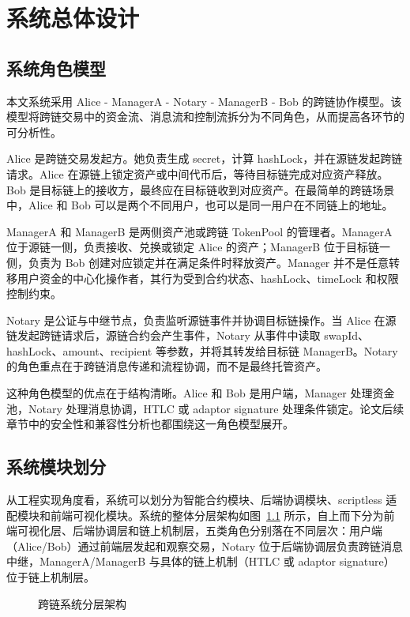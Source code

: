 
\chapter{系统总体设计}


\section{系统角色模型}


本文系统采用 Alice - ManagerA - Notary - ManagerB - Bob 的跨链协作模型。该模型将跨链交易中的资金流、消息流和控制流拆分为不同角色，从而提高各环节的可分析性。


Alice 是跨链交易发起方。她负责生成 secret，计算 hashLock，并在源链发起跨链请求。Alice 在源链上锁定资产或中间代币后，等待目标链完成对应资产释放。Bob 是目标链上的接收方，最终应在目标链收到对应资产。在最简单的跨链场景中，Alice 和 Bob 可以是两个不同用户，也可以是同一用户在不同链上的地址。


ManagerA 和 ManagerB 是两侧资产池或跨链 TokenPool 的管理者。ManagerA 位于源链一侧，负责接收、兑换或锁定 Alice 的资产；ManagerB 位于目标链一侧，负责为 Bob 创建对应锁定并在满足条件时释放资产。Manager 并不是任意转移用户资金的中心化操作者，其行为受到合约状态、hashLock、timeLock 和权限控制约束。


Notary 是公证与中继节点，负责监听源链事件并协调目标链操作。当 Alice 在源链发起跨链请求后，源链合约会产生事件，Notary 从事件中读取 swapId、hashLock、amount、recipient 等参数，并将其转发给目标链 ManagerB。Notary 的角色重点在于跨链消息传递和流程协调，而不是最终托管资产。


这种角色模型的优点在于结构清晰。Alice 和 Bob 是用户端，Manager 处理资金池，Notary 处理消息协调，HTLC 或 adaptor signature 处理条件锁定。论文后续章节中的安全性和兼容性分析也都围绕这一角色模型展开。


\section{系统模块划分}


从工程实现角度看，系统可以划分为智能合约模块、后端协调模块、scriptless 适配模块和前端可视化模块。系统的整体分层架构如图~\ref{fig:crosschain_arch} 所示，自上而下分为前端可视化层、后端协调层和链上机制层，五类角色分别落在不同层次：用户端（Alice/Bob）通过前端层发起和观察交易，Notary 位于后端协调层负责跨链消息中继，ManagerA/ManagerB 与具体的链上机制（HTLC 或 adaptor signature）位于链上机制层。

\begin{figure}[htbp]
  \centering
  
  \caption{跨链系统分层架构}
  \label{fig:crosschain_arch}
\end{figure}


